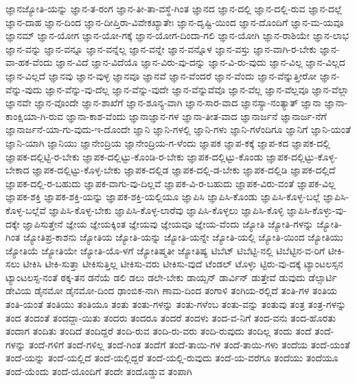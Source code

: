 {ಜ್ಞಾನಜ್ಯೋತಿ-ಯನ್ನು
ಜ್ಞಾನ-ತ-ರಂಗ
ಜ್ಞಾನ-ತೀ-ತಾ-ವಸ್ಥೆ-ಗಿಂತ
ಜ್ಞಾನದ
ಜ್ಞಾನ-ದಲ್ಲಿ
ಜ್ಞಾನ-ದಲ್ಲಿ-ರುವ
ಜ್ಞಾನ-ದಲ್ಲೆ
ಜ್ಞಾನ-ದಾಹ
ಜ್ಞಾನ-ದಿಂದ
ಜ್ಞಾನ-ದೀಪ್ತಿರಾ-ವಿವೇಕಖ್ಯಾತೇಃ
ಜ್ಞಾನ-ದೃಷ್ಟಿ-ಯಿಂದ
ಜ್ಞಾನ-ದೊಂದಿಗೆ
ಜ್ಞಾನ-ಮ-ಯವೂ
ಜ್ಞಾನಮ್
ಜ್ಞಾನ-ಯೋಗ
ಜ್ಞಾನ-ಯೋ-ಗಕ್ಕೆ
ಜ್ಞಾನ-ಯೋಗ-ದಿಂದಾ-ಗಲಿ
ಜ್ಞಾನ-ಯೋಗಿ
ಜ್ಞಾನ-ರಾಶಿಯೇ
ಜ್ಞಾನ-ಲಾಭ
ಜ್ಞಾನ-ವನ್ನು
ಜ್ಞಾನ-ವನ್ನೂ
ಜ್ಞಾನ-ವನ್ನೆಲ್ಲ
ಜ್ಞಾನ-ವನ್ನೇ
ಜ್ಞಾನ-ವನ್ನೊಳ
ಜ್ಞಾನ-ವಸ್ತು
ಜ್ಞಾನ-ವಾಗಿ-ರ-ಬೇಕು
ಜ್ಞಾನ-ವಾ-ಹಕ-ವೆಂದು
ಜ್ಞಾನ-ವಿದೆ
ಜ್ಞಾನ-ವಿದೆಯೊ
ಜ್ಞಾನ-ವಿರು-ವು-ದನ್ನು
ಜ್ಞಾನ-ವಿ-ರು-ವುದು
ಜ್ಞಾನ-ವಿಲ್ಲ
ಜ್ಞಾನ-ವಿಲ್ಲದ
ಜ್ಞಾನ-ವಿಲ್ಲದೆ
ಜ್ಞಾನವು
ಜ್ಞಾನ-ವುಳ್ಳ
ಜ್ಞಾನವೂ
ಜ್ಞಾನವೆ
ಜ್ಞಾನ-ವೆಂದರೆ
ಜ್ಞಾನ-ವೆಂದು
ಜ್ಞಾನ-ವೆನ್ನುತ್ತೀರೋ
ಜ್ಞಾನ-ವೆನ್ನು-ವುದು
ಜ್ಞಾನ-ವೆನ್ನು-ವು-ದೆಲ್ಲ
ಜ್ಞಾನ-ವೆನ್ನು-ವುದೇ
ಜ್ಞಾನ-ವೆನ್ನುವೆವೊ
ಜ್ಞಾನ-ವೆಲ್ಲ
ಜ್ಞಾನ-ವೆಲ್ಲವೂ
ಜ್ಞಾನ-ವೆಲ್ಲಾ
ಜ್ಞಾನವೇ
ಜ್ಞಾನ-ವೊಂದೇ
ಜ್ಞಾನ-ಶಾಖೆಗೆ
ಜ್ಞಾನ-ಶೂನ್ಯ-ವಾಗಿ
ಜ್ಞಾನ-ಸಾರ-ವಾದ
ಜ್ಞಾನಸ್ಯಾ-ನಂತ್ಯಾತ್
ಜ್ಞಾನಾ
ಜ್ಞಾನಾ-ಕಾಂಕ್ಷಿಯಾ-ಗಿ-ರುವ
ಜ್ಞಾನಾ-ಕಾಶ-ವೆಂದು
ಜ್ಞಾನಾಜ್ಞಾನ-ಗಳ
ಜ್ಞಾನಾ-ತೀತ-ವಾದ
ಜ್ಞಾನಾರ್ಜನೆ
ಜ್ಞಾನಾರ್ಜ-ನೆಗೆ
ಜ್ಞಾನಾರ್ಜನೆ-ಯಾ-ಗು-ವುದು-ಇ-ದೊಂದೇ
ಜ್ಞಾನಿ
ಜ್ಞಾನಿ-ಗಳಲ್ಲಿ
ಜ್ಞಾನಿ-ಗಳು
ಜ್ಞಾನಿ-ಗಳೆಂದಿಗೂ
ಜ್ಞಾನಿಗೆ
ಜ್ಞಾನಿ-ಯಂತೆ
ಜ್ಞಾನಿ-ಯಾಗಿ
ಜ್ಞಾನಿಯು
ಜ್ಞಾನೇಂದ್ರಿಯ
ಜ್ಞಾನೇಂದ್ರಿಯ-ಗ-ಳೆಂದು
ಜ್ಞಾಪಕ
ಜ್ಞಾಪ-ಕಕ್ಕೆ
ಜ್ಞಾಪ-ಕದ
ಜ್ಞಾಪಕ-ದಲ್ಲಿ
ಜ್ಞಾಪಕ-ದಲ್ಲಿಟ್ಟಿ-ರ-ಬೇಕು
ಜ್ಞಾಪಕ-ದಲ್ಲಿಟ್ಟು-ಕೊಂಡಿ-ರ-ಬೇಕು
ಜ್ಞಾಪಕ-ದಲ್ಲಿಟ್ಟು-ಕೊಂಡು
ಜ್ಞಾಪಕ-ದಲ್ಲಿಟ್ಟು-ಕೊಳ್ಳ-ಬೇಕಾದ
ಜ್ಞಾಪಕ-ದಲ್ಲಿಟ್ಟು-ಕೊಳ್ಳ-ಬೇಕು
ಜ್ಞಾಪಕ-ದಲ್ಲಿಡ
ಜ್ಞಾಪಕ-ದಲ್ಲಿ-ಡ-ಬೇಕು
ಜ್ಞಾಪಕ-ದಲ್ಲಿಡಿ
ಜ್ಞಾಪಕ-ದಲ್ಲಿದೆ
ಜ್ಞಾಪಕ-ದಲ್ಲಿ-ರ-ಬಹುದು
ಜ್ಞಾಪಕ-ವಾಗು-ವು-ದಿಲ್ಲವೆ
ಜ್ಞಾಪಕ-ವಿ-ರ-ಬಹುದು
ಜ್ಞಾಪಕ-ವಿರು-ವಂತೆ
ಜ್ಞಾಪಕ-ವಿಲ್ಲ
ಜ್ಞಾಪಕ-ಶಕ್ತಿ
ಜ್ಞಾಪಕ-ಶಕ್ತಿ-ಯನ್ನು
ಜ್ಞಾಪಕ-ಶಕ್ತಿ-ಯಲ್ಲಿಯೂ
ಜ್ಞಾಪಿಸಿ
ಜ್ಞಾಪಿಸಿ-ಕೊಂಡು
ಜ್ಞಾಪಿಸಿ-ಕೊಳ್ಳ-ಬಲ್ಲೆ
ಜ್ಞಾಪಿಸಿ-ಕೊಳ್ಳ-ಬಲ್ಲೆವೆ
ಜ್ಞಾಪಿಸಿ-ಕೊಳ್ಳ-ಬೇಕು
ಜ್ಞಾಪಿಸಿ-ಕೊಳ್ಳ-ಲಾರೆವು
ಜ್ಞಾಪಿಸಿ-ಕೊಳ್ಳಲು
ಜ್ಞಾಪಿಸಿ-ಕೊಳ್ಳಿ
ಜ್ಞಾಪಿಸಿ-ಕೊಳ್ಳು-ವು-ದಕ್ಕೇ
ಜ್ಞಾಪಿಸುತ್ತೇನೆ
ಜ್ಞೇಯ
ಜ್ಞೇಯಕ್ಕಿಂತ
ಜ್ಞೇಯವು
ಜ್ಞೇಯವೂ
ಜ್ಞೇಯ-ವೆಂದು
ಜ್ಯೋತಿ
ಜ್ಯೋತಿ-ಗಳನ್ನು
ಜ್ಯೋತಿ-ಗಿಂತ
ಜ್ಯೋತಿಪ್ರ-ಕಾಶನು
ಜ್ಯೋತಿಯ
ಜ್ಯೋತಿ-ಯನ್ನು
ಜ್ಯೋತಿ-ಯನ್ನೇ
ಜ್ಯೋತಿ-ಯಲ್ಲಿ
ಜ್ಯೋತಿ-ಯಿಂದ
ಜ್ಯೋತಿಯು
ಜ್ಯೋತಿಯೆ
ಜ್ಯೋತಿಯೇ
ಜ್ಯೋತಿ-ಯೊ-ಳಗೆ
ಜ್ಯೋತಿಷ್ಮತೀ
ಜ್ಯೋತಿಷ್ಯ
ಟಿಬೆಟ್
ಟಿಬೆಟ್ಟಿ-ನಲ್ಲಿ
ಟಿಬೆಟ್ಟಿನ-ವ-ರಿಗೆ
ಟೀಕಿ-ಸಲು
ಟೀಕಿಸಿ
ಟೀಕಿ-ಸುತ್ತಾ
ಟೀಕಿಸುತ್ತಿಲ್ಲ
ಟೀಕಿಸು-ವರು
ಟೀಕಿಸು-ವುದೆ
ಟೆಂಡಲ್
ಟೊಳ್ಳು
ಟ್ಟಿರು-ವು-ದಕ್ಕೆ
ಟ್ಯಾಂಟಲಸ್ಸನ
ಟ್ಯಾಂಟಲಸ್ಸ-ನಂತೆ
ಠಕ್ಕ-ತನ
ಡನೆಯೆ
ಡಲಿ
ಡಲು
ಡಲೇ-ಬೇಕು
ಡಾಯ್ಸನ್
ಡಾರ್ವಿನ್
ಡುತ್ತೇವೆ
ಡುವುದು
ಡೆಲ್ಸಾರ್ಟಿ
ಡೇವಿಯ
ಡೈನಮೋ
ಡೈನಮೋ-ದಿಂದ
ಢಾಂಬಿಕ-ನಾಗಿ
ಣಾಮ-ದಿಂದ
ತಂಗಾಳಿ
ತಂಗಿಯ-ರಲ್ಲಿದೆ
ತಂತಿ-ಗಳ
ತಂತಿಯ
ತಂತಿ-ಯಂತೆ
ತಂತಿಯು
ತಂತಿಯೂ
ತಂತು
ತಂತು-ಗಳನ್ನು
ತಂತು-ಗಳೆಂಬ
ತಂತು-ವನ್ನು
ತಂತುವು
ತಂತ್ರ
ತಂತ್ರ-ಗಳನ್ನು
ತಂದ
ತಂದಂತೆ
ತಂದದ್ದಾ-ಯಿತು
ತಂದರು
ತಂದರೂ
ತಂದರೆ
ತಂದಳು
ತಂದ-ವ-ನಿಗೆ
ತಂದ-ವನು
ತಂದ-ಹೊರತು
ತಂದಾಗ
ತಂದಿತು
ತಂದಿದೆ
ತಂದಿದ್ದರೆ
ತಂದಿ-ರುವ
ತಂದಿ-ರು-ವರು
ತಂದಿ-ರುವುದು
ತಂದಿಲ್ಲ
ತಂದು
ತಂದೆ
ತಂದೆ-ಗಳನ್ನು
ತಂದೆ-ಗಳಿಗೆ
ತಂದೆ-ಗಳಿಲ್ಲ
ತಂದೆ-ಗಿಂತ
ತಂದೆಗೆ
ತಂದೆ-ತಾಯಿ-ಗಳ
ತಂದೆ-ತಾಯಿ-ಗಳು
ತಂದೆಯ
ತಂದೆ-ಯಂತೆ
ತಂದೆ-ಯನ್ನು
ತಂದೆ-ಯಲ್ಲಿದೆ
ತಂದೆ-ಯಲ್ಲಿದ್ದರೆ
ತಂದೆ-ಯಲ್ಲಿ-ರುವುದು
ತಂದೆ-ಯ-ವರೆಗೂ
ತಂದೆಯು
ತಂದೆಯೂ
ತಂದೆ-ಯೆಂದು
ತಂದೆ-ಯೊಂದಿಗೆ
ತಂದೇ
ತಂದೊಡ್ಡುವ
ತಂಪಾಗಿ
}
